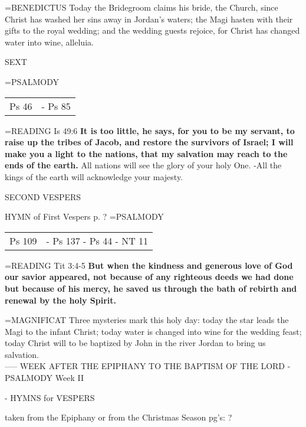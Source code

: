 \hangindent=\parindent \small{BENEDICTUS 	Today the Bridegroom claims his bride, the Church, since Christ has washed her sins away in Jordan's waters; the Magi hasten with their gifts to the royal wedding; and the wedding guests rejoice, for Christ has changed water into wine, alleluia.\\}

\begin{flushleft}\normalsize SEXT\\\end{flushleft}
\hangindent=\parindent \small{PSALMODY}
\begin{center}
\begin{tabular}{ l l }
Ps 46 &  - Ps 85\\
\end{tabular}
\end{center}		

\hangindent=\parindent \small{READING}    Is 49:6 \textbf{    It is too little, he says, for you to be my servant, to raise up the tribes of Jacob, and restore the survivors of Israel; I will make you a light to the nations, that my salvation may reach to the ends of the earth.}
All nations will see the glory of your holy One.
-All the kings of the earth will acknowledge your majesty.

\begin{flushleft}\normalsize SECOND VESPERS\\\end{flushleft}

HYMN of First Vespers p. ?
\hangindent=\parindent \small{PSALMODY}
\begin{center}
\begin{tabular}{ l l }
Ps 109 &  - Ps 137 - Ps 44 - NT 11\\
\end{tabular}
\end{center}		

\hangindent=\parindent \small{READING}    Tit 3:4-5 \textbf{    But when the kindness and generous love of God our savior appeared, not because of any righteous deeds we had done but because of his mercy, he saved us through the bath of rebirth and renewal by the holy Spirit.\\}

\hangindent=\parindent \small{MAGNIFICAT 	Three mysteries mark this holy day: today the star leads the Magi to the infant Christ; today water is changed into wine for the wedding feast; today Christ will to be baptized by John in the river Jordan to bring us salvation.\\}
-----
WEEK AFTER THE EPIPHANY TO THE BAPTISM OF THE LORD
- PSALMODY Week II
\begin{flushleft}\normalsize - HYMNS for VESPERS\\\end{flushleft} taken from the Epiphany or from the Christmas Season pg's: ?

